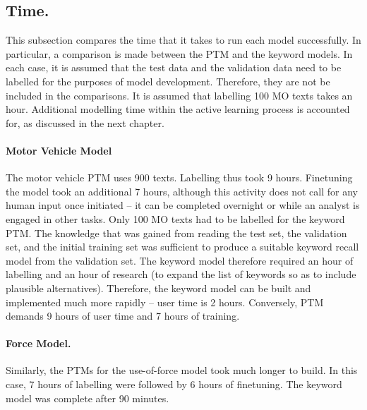 \subsection{Time.} This subsection compares the time that it takes to run each model successfully. In particular, a comparison is made between the PTM and the keyword models. In each case, it is assumed that the test data and the validation data need to be labelled for the purposes of model development. Therefore, they are not be included in the comparisons. It is assumed that labelling 100 MO texts takes an hour. Additional modelling time within the active learning process is accounted for, as discussed in the next chapter.

\paragraph{Motor Vehicle Model} The motor vehicle PTM uses 900 texts. Labelling thus took 9 hours. Finetuning the model took an additional 7 hours, although this activity does not call for any human input once initiated – it can be completed overnight or while an analyst is engaged in other tasks. Only 100 MO texts had to be labelled for the keyword PTM. The knowledge that was gained from reading the test set, the validation set, and the initial training set was sufficient to produce a suitable keyword recall model from the validation set. The keyword model therefore required an hour of labelling and an hour of research (to expand the list of keywords so as to include plausible alternatives). Therefore, the keyword model can be built and implemented much more rapidly – user time is 2 hours. Conversely, PTM demands 9 hours of user time and 7 hours of training. 

\paragraph{Force Model.}Similarly, the PTMs for the use-of-force model took much longer to build. In this case, 7 hours of labelling were followed by 6 hours of finetuning. The keyword model was complete after 90 minutes.

